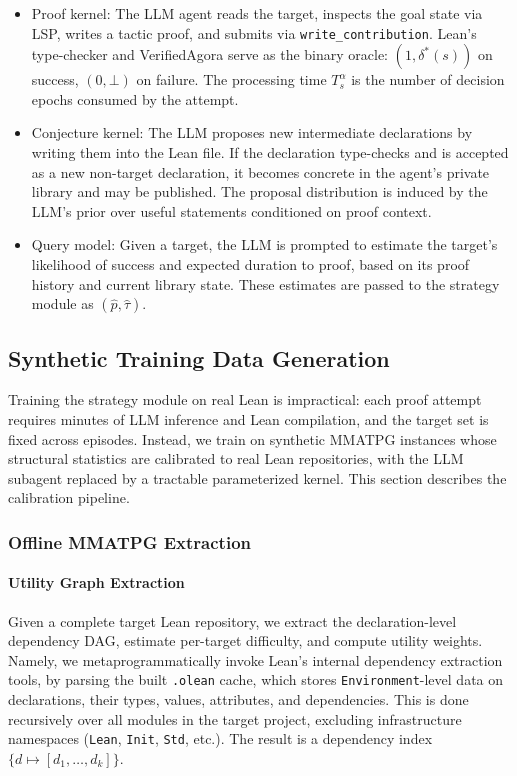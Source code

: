 \begin{itemize}
    \item Proof kernel: The LLM agent reads the target, inspects the goal state via LSP, writes a tactic proof, and submits via \texttt{write\_contribution}. Lean's type-checker and VerifiedAgora serve as the binary oracle: $(1, \delta^*(s))$ on success, $(0, \bot)$ on failure. The processing time $T^\alpha_s$ is the number of decision epochs consumed by the attempt.
    \item Conjecture kernel: The LLM proposes new intermediate declarations by writing them into the Lean file. If the declaration type-checks and is accepted as a new non-target declaration, it becomes concrete in the agent's private library and may be published. The proposal distribution is induced by the LLM's prior over useful statements conditioned on proof context.
    \item Query model: Given a target, the LLM is prompted to estimate the target's likelihood of success and expected duration to proof, based on its proof history and current library state. These estimates are passed to the strategy module as $(\hat{p}, \hat{\tau})$.
\end{itemize}


\subsection{Synthetic Training Data Generation}\label{sec:training}

Training the strategy module on real Lean is impractical: each proof attempt requires minutes of LLM inference and Lean compilation, and the target set is fixed across episodes. Instead, we train on synthetic MMATPG instances whose structural statistics are calibrated to real Lean repositories, with the LLM subagent replaced by a tractable parameterized kernel. This section describes the calibration pipeline.


\subsubsection{Offline MMATPG Extraction}\label{sec:dep-extraction}


\paragraph{Utility Graph Extraction}\label{sec:util-extraction}

Given a complete target Lean repository, we extract the declaration-level dependency DAG, estimate per-target difficulty, and compute utility weights. Namely, we metaprogrammatically invoke Lean's internal dependency extraction tools, by parsing the built \texttt{.olean} cache, which stores \texttt{Environment}-level data on declarations, their types, values, attributes, and dependencies. This is done recursively over all modules in the target project, excluding infrastructure namespaces (\texttt{Lean}, \texttt{Init}, \texttt{Std}, etc.). The result is a dependency index $\{d \mapsto [d_1, \ldots, d_k]\}$.


